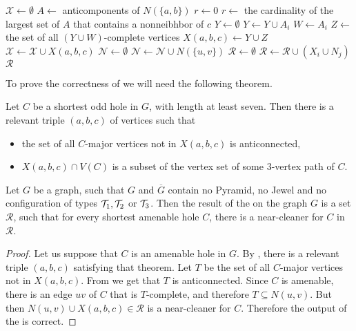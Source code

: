 \begin{algorithmic}[1]
	\ls $\mathcal{X} \gets \emptyset$
		\ls $A \gets$ anticomponents of $N(\{a, b\})$
			\ls $r \gets 0$
		\mElse
			\ls $r \gets$ the cardinality of the largest set of $A$ that contains 
			\lsx a nonneibhbor of $c$ 
		\mEndIf
		\ls $Y \gets \emptyset$ 
				\ls $Y \gets Y \cup A_i$
			\mEndIf
				\ls $W \gets A_i$
			\mEndIf
		\mEndFor
		\ls $Z \gets$ the set of all $(Y \cup W)$-complete vertices
		\ls $X(a, b, c) \gets Y \cup Z$ 
		\ls $\mathcal{X} \gets \mathcal{X} \cup X(a, b, c)$
	\mEndFor
	\ls $\mathcal{N} \gets \emptyset$
		\ls $\mathcal{N} \gets \mathcal{N} \cup N(\{u, v\})$
	\mEndFor
	\ls $\mathcal{R} \gets \emptyset$
			\ls $\mathcal{R} \gets \mathcal{R} \cup (X_i \cup N_j)$ \label{line:listNCcalcR}
		\mEndFor
	\mEndFor
	\ls \RETURN $\mathcal{R}$
	\mEndProcedure
\end{algorithmic}

To prove the correctness of  we will need the following theorem.

\begin{theorem}
	\label{thm:91}
	Let $C$ be a shortest odd hole in $G$, with length at least seven. Then there is a relevant triple $(a, b, c)$ of vertices such that
	\begin{itemize}
		\item the set of all $C$-major vertices not in $X(a, b, c)$ is anticonnected,
		\item $X(a, b, c) \cap V(C)$ is a subset of the vertex set of some 3-vertex path of $C$.
	\end{itemize}
\end{theorem}

\begin{theorem}
	\label{thm:92}
	Let $G$ be a graph, such that $G$ and $\overline{G}$ contain no Pyramid, no Jewel and no configuration of types $\mathcal{T}_1, \mathcal{T}_2$ or $\mathcal{T}_3$. Then the result of the  on the graph $G$ is a set $\mathcal{R}$, such that for every shortest amenable hole $C$, there is a near-cleaner for $C$ in $\mathcal{R}$.
\end{theorem}
\begin{proof}
	Let us suppose that $C$ is an amenable hole in $G$. By , there is a relevant triple $(a, b, c)$ satisfying that theorem. Let $T$ be the set of all $C$-major vertices not in $X(a,b,c)$. From  we get that $T$ is anticonnected. Since $C$ is amenable, there is an edge $uv$ of $C$ that is $T$-complete, and therefore $T \subseteq N(u, v)$. But then $N(u, v) \cup X(a, b, c) \in \mathcal{R}$ is a near-cleaner for $C$. Therefore the output of the  is correct.
\end{proof}

